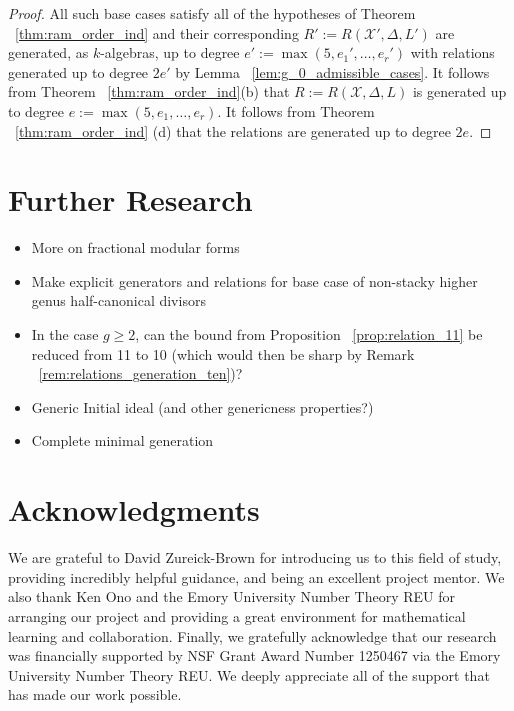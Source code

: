 \documentclass{amsart}
\theoremstyle{plain}
\theoremstyle{definition}
\theoremstyle{remark}
\numberwithin{equation}{section}
\newcommand \sx{\mathscr X}
\newcommand \halfcan{L}
\begin{document}
\begin{proof}
All such base cases satisfy all of the hypotheses of
Theorem ~\ref{thm:ram_order_ind} and their corresponding $R' :=
R(\sx', \Delta, \halfcan')$ are generated, as $k$-algebras, up
to degree $e' := \max(5, e_1', \ldots, e_r')$ with relations
generated up to degree $2e'$ by Lemma ~\ref{lem:g_0_admissible_cases}.
It follows from Theorem ~\ref{thm:ram_order_ind}(b) that $R :=
R(\sx, \Delta, \halfcan)$ is generated up to degree $e := \max(5,
e_1, \ldots, e_r)$. It follows from Theorem ~\ref{thm:ram_order_ind}
(d) that the relations are generated up to degree $2e$.
\end{proof}

\section{Further Research}
\label{sec:further-questions}
\begin{itemize}
	\item More on fractional modular forms
	\item Make explicit generators and relations for base case of non-stacky higher genus half-canonical divisors
	\item In the case $g \geq 2$, can the bound from Proposition ~\ref{prop:relation_11} be reduced from 11 to 10 (which would then be sharp by Remark ~\ref{rem:relations_generation_ten})?  
	\item Generic Initial ideal (and other genericness properties?)
	\item Complete minimal generation
\end{itemize}


\section{Acknowledgments}
We are grateful to David Zureick-Brown for introducing us to this
field of study, providing incredibly helpful guidance, and being an
excellent project mentor. We also thank Ken Ono and the Emory University
Number Theory REU for arranging our project and providing a great
environment for mathematical learning and collaboration. Finally, we
gratefully acknowledge that our research was financially supported by
NSF Grant Award Number 1250467 via the Emory University Number Theory REU.
We deeply appreciate all of the support that has made our work possible.


\nocite{*}
{}

\end{document}
